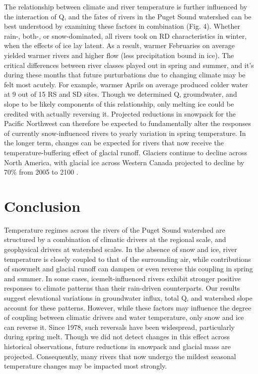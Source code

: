 \documentclass[notitlepage]{article}
\begin{document}
The relationship between climate and river temperature is further influenced by the interaction of Q, and the fates of rivers in the Puget Sound watershed can be best understood by examining these factors in combination (Fig. 4). Whether rain-, both-, or snow-dominated, all rivers took on RD characteristics in winter, when the effects of ice lay latent. As a result, warmer Februaries on average yielded warmer rivers and higher flow (less precipitation bound in ice). The critical differences between river classes played out in spring and summer, and it's during these months that future purturbations due to changing climate may be felt most acutely. For example, warmer Aprils on average produced colder water at 9 out of 15 RS and SD sites. Though we determined Q, groundwater, and slope to be likely components of this relationship, only melting ice could be credited with actually reversing it. Projected reductions in snowpack for the Pacific Northwest can therefore be expected to fundamentally alter the responses of currently snow-influenced rivers to yearly variation in spring temperature. In the longer term, changes can be expected for rivers that now receive the temperature-buffering effect of glacial runoff. Glaciers continue to decline across North America, with glacial ice across Western Canada projected to decline by 70\% from 2005 to 2100 \citep{clarke2015projected}.

\section*{Conclusion}

Temperature regimes across the rivers of the Puget Sound watershed are structured by a combination of climatic drivers at the regional scale, and geophysical drivers at watershed scales. In the absence of snow and ice, river temperature is closely coupled to that of the surrounding air, while contributions of snowmelt and glacial runoff can dampen or even reverse this coupling in spring and summer. In some cases, icemelt-influenced rivers exhibit stronger positive responses to climate patterns than their rain-driven counterparts. Our results suggest elevational variations in groundwater influx, total Q, and watershed slope account for these patterns. However, while these factors may influence the degree of coupling between climatic drivers and water temperature, only snow and ice can reverse it. Since 1978, such reversals have been widespread, particularly during spring melt. Though we did not detect changes in this effect across historical observations, future reductions in snowpack and glacial mass are projected. Consequently, many rivers that now undergo the mildest seasonal temperature changes may be impacted most strongly.
\clearpage
\end{document}

